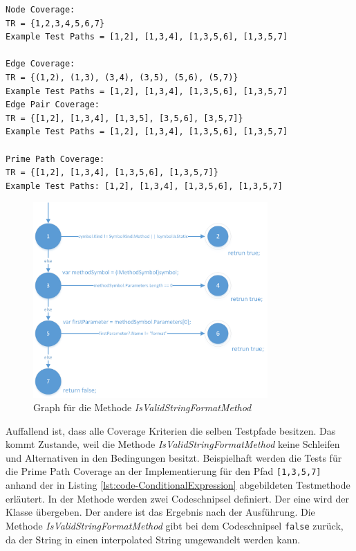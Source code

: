 \begin{lstlisting}[caption={Coverage für die Mehtode \textit{IsValidStringFormatMethod}},
label=lst:coverage-IsValidStringFormatMethod]
Node Coverage:
TR = {1,2,3,4,5,6,7}
Example Test Paths = [1,2], [1,3,4], [1,3,5,6], [1,3,5,7]

Edge Coverage:
TR = {(1,2), (1,3), (3,4), (3,5), (5,6), (5,7)}
Example Test Paths = [1,2], [1,3,4], [1,3,5,6], [1,3,5,7]
Edge Pair Coverage:
TR = {[1,2], [1,3,4], [1,3,5], [3,5,6], [3,5,7]}
Example Test Paths = [1,2], [1,3,4], [1,3,5,6], [1,3,5,7]

Prime Path Coverage:
TR = {[1,2], [1,3,4], [1,3,5,6], [1,3,5,7]}
Example Test Paths: [1,2], [1,3,4], [1,3,5,6], [1,3,5,7]
\end{lstlisting}
\begin{figure}[h]
	\centering
	\includegraphics[width=0.8\textwidth]{images/GraphISValidStringFormatMethod.png}
	\caption{Graph für die Methode \textit{IsValidStringFormatMethod}}
	\label{fig:graph-validstring}
\end{figure}
Auffallend ist, dass alle Coverage Kriterien die selben Testpfade besitzen. Das kommt Zustande, weil die Methode \textit{IsValidStringFormatMethod} keine Schleifen und Alternativen in den Bedingungen besitzt. Beispielhaft werden die Tests für die Prime Path Coverage an der Implementierung für den Pfad \texttt{[1,3,5,7]} anhand der in Listing \ref{lst:code-ConditionalExpression} abgebildeten Testmethode erläutert. In der Methode werden zwei Codeschnipsel definiert. Der eine wird der Klasse übergeben. Der andere ist das Ergebnis nach der Ausführung. Die Methode \textit{IsValidStringFormatMethod} gibt bei dem Codeschnipsel \texttt{false} zurück, da der String in einen interpolated String umgewandelt werden kann.

